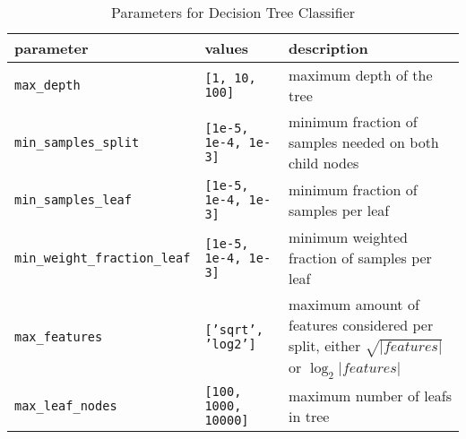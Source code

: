 \begin{table}[H]
	\caption{Parameters for Decision Tree Classifier}
	\label{TreeParams}
	\begin{tabularx}{\textwidth}{ l l X}
		parameter & values & description \\
		\hline
		\texttt{max\_depth} & \texttt{[1, 10, 100]} & maximum depth of the tree \\
		\texttt{min\_samples\_split} & \texttt{[1e-5, 1e-4, 1e-3]} & minimum fraction of samples needed on both child nodes \\
		\texttt{min\_samples\_leaf} & \texttt{[1e-5, 1e-4, 1e-3]} & minimum fraction of samples per leaf \\
		\texttt{min\_weight\_fraction\_leaf} & \texttt{[1e-5, 1e-4, 1e-3]} & minimum weighted fraction of samples per leaf \\
		\texttt{max\_features} & \texttt{['sqrt', 'log2']} & maximum amount of features considered per split, either $\sqrt{|features|}$ or $\log_2{|features|}$ \\
		\texttt{max\_leaf\_nodes} & \texttt{[100, 1000, 10000]} & maximum number of leafs in tree
	\end{tabularx}
\end{table}

